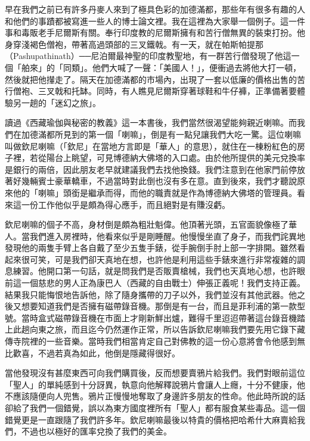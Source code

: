 
早在我們之前已有許多丹麥人來到了極具色彩的加德滿都，那些年有很多有趣的人和他們的事蹟都被寫進一些人的博士論文裡。我在這裡為大家舉一個例子。這一件事和毒販老手尼爾斯有關。奉行印度教的尼爾斯擁有和苦行僧無異的裝束打扮。他身穿淺褐色僧袍，帶著高過頭部的三叉鐵戟。有一天，就在帕斯帕提那（Pashupathinath）──尼泊爾最神聖的印度教聖地，有一群苦行僧發現了他這一個「舶來」的「同類」。他們大喊了一聲：「美國人！」，便衝過去將他大打一頓，然後就把他攆走了。隔天在加德滿都的市場內，出現了一套以低廉的價格出售的苦行僧袍、三叉戟和托缽。同時，有人瞧見尼爾斯穿著球鞋和牛仔褲，正準備著要體驗另一趟的「迷幻之旅」。

讀過《西藏瑜伽與秘密的教義》這一本書後，我們當然很渴望能夠親近喇嘛。而我們在加德滿都所見到的第一個「喇嘛」，倒是有一點兒讓我們大吃一驚。這位喇嘛叫做欽尼喇嘛（「欽尼」在當地方言即是「華人」的意思），就住在一棟粉紅色的房子裡，若從陽台上眺望，可見博德納大佛塔的入口處。由於他所提供的美元兌換率是銀行的兩倍，因此朋友老早就建議我們去找他換錢。我們注意到在他家門前停放著好幾輛賓士豪華轎車，不過當時對此倒也沒有多在意。直到後來，我們才聽說原來他的「喇嘛」頭銜是繼承而得，而他的職責就是作為博德納大佛塔的管理員。看來這一份工作他似乎是頗為得心應手，而且絕對是有賺沒虧。

欽尼喇嘛的個子不高，身材倒是頗為粗壯魁偉。他頂著光頭，五官面貌像極了華人。當我們進入房裡時，他看來似乎是剛睡醒。他慢慢坐直了身子，而我們詫異地發現他的兩隻手臂上各自戴了至少五隻手錶，從手腕倒手肘上部一字排開。雖然看起來很可笑，可是我們卻天真地在想，也許他是利用這些手錶來進行非常複雜的調息練習。他開口第一句話，就是問我們是否販賣槍械，我們也天真地心想，也許眼前這一個慈悲的男人正為康巴人（西藏的自由戰士）伸張正義呢！我們支持正義。結果我只能悔恨地告訴他，除了隨身攜帶的刀子以外，我們並沒有其他武器。他之後又想要知道我們是否擁有磁帶錄音機。那倒是有一台，而且是菲利浦的第一款型號。當時盒式磁帶錄音機在市面上才剛新鮮出爐，難得千里迢迢帶著這台錄音機踏上此趟向東之旅，而且迄今仍然運作正常，所以告訴欽尼喇嘛我們要先用它錄下藏傳寺院裡的一些音樂。當時我們相當肯定自己對佛教的這一份心意將會令他感到無比歡喜，不過若真為如此，他倒是隱藏得很好。

當他發現沒有甚麼東西可向我們購買後，反而想要賣鴉片給我們。我們對眼前這位「聖人」的單純感到十分訝異，執意向他解釋說鴉片會讓人上癮，十分不健康，他不應該隨便向人兜售。鴉片正慢慢地奪取了身邊許多朋友的性命。他此時所說的話卻給了我們一個錯覺，誤以為東方國度裡所有「聖人」都有服食某些毒品。這一個錯覺更是一直跟隨了我們許多年。欽尼喇嘛最後以特貴的價格把哈希什大麻賣給我們，不過也以極好的匯率兌換了我們的美金。

